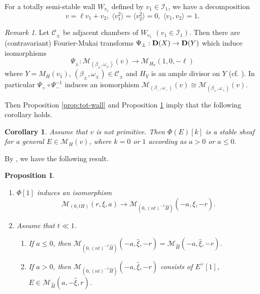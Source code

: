 \documentclass[10pt]{amsart}
\def\cal{\mathcal}
\numberwithin{equation}{section}
\theoremstyle{plain}
\newtheorem{prop}[thm]{Proposition}
\newtheorem{cor}[thm]{Corollary}
\theoremstyle{definition}
\theoremstyle{remark}
\newtheorem{rem}[thm]{Remark}
\begin{document}
For a totally semi-stable wall $W_{v_1}$ defined by $v_1 \in {\cal I}_1$,
we have a decomposition
\begin{equation}\label{eq:tss-eq}
v=\ell v_1+v_2, \; \langle v_1^2 \rangle=\langle v_2^2 \rangle=0,\; 
\langle v_1,v_2 \rangle=1. 
\end{equation}

\begin{rem}\label{rem:codim0}
Let ${\cal C}_\pm$ be adjacent chambers of $W_{v_1}$ $(v_1 \in {\cal I}_1)$.
Then there are (contravariant) Fourier-Mukai transforms
$\Psi_\pm:{\bf D}(X) \to {\bf D}(Y)$ which induce isomorphisms
$$
\Psi_\pm:{\cal M}_{(\beta_\pm,\omega_\pm)}(v) \to  {\cal M}_{H_Y}(1,0,-\ell)
$$
where $Y=M_H(v_1)$, $(\beta_\pm,\omega_\pm) \in {\cal C}_\pm$ and $H_Y$ is an ample divisor on $Y$
(cf. \cite[Thm. 4.9]{MYY2}).
In particular 
$\Psi_+ \circ \Psi_-^{-1}$ induces an isomorphism
${\cal M}_{(\beta_-,\omega_-)}(v) \cong {\cal M}_{(\beta_+,\omega_+)}(v)$.
\end{rem}

Then Proposition \ref{prop:tot-wall} and Proposition \ref{prop:isom} imply that
the following corollary holds.
\begin{cor}\label{cor:non-primitive}
Assume that $v$ is not primitive.
Then $\Phi(E)[k]$ is a stable sheaf for a general $E \in {\cal M}_H(v)$, where $k=0$ or $1$ according as 
$a>0$ or $a \leq 0$.
\end{cor}



By \cite[Thm. 3.8, Prop. 5.14]{YY2}, we have the following result.
\begin{prop}\label{prop:isom}
\begin{enumerate}
\item[(1)]
$\Phi[1]$ induces an isomorphism
$$
{\cal M}_{(0,tH)}(r,\xi,a) \to {\cal M}_{(0,(nt)^{-1} \widehat{H})}(-a,\widehat{\xi},-r).
$$
\item[(2)]
Assume that $t \ll 1$.
\begin{enumerate}
\item
If $a \leq 0$, then
${\cal M}_{(0,(nt)^{-1} \widehat{H})}(-a,\widehat{\xi},-r)={\cal M}_{\widehat{H}}(-a,\widehat{\xi},-r)$.
\item
If $a>0$, then
${\cal M}_{(0,(nt)^{-1} \widehat{H})}(-a,\widehat{\xi},-r)$ 
consists of $E^{\vee}[1]$, $E \in {\cal M}_{\widehat{H}}(a,-\widehat{\xi},r)$.
\end{enumerate}
\end{enumerate}
\end{prop}
\end{document}

